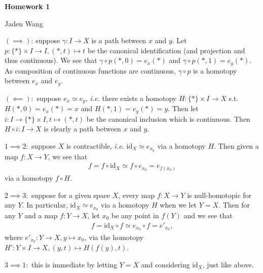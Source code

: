 \documentclass[12pt]{article}
\begin{document}
\centerline {\textsf{\textbf{\LARGE{Homework 1}}}}
\centerline {Jaden Wang}
\vspace{.15in}
\begin{problem}[1]
$ (\implies)$: suppose $ \gamma: I \to X$ is a path between $ x$ and  $ y$. Let $ p: \{*\} \times I \to I, (*,t) \mapsto t$ be the canonical identification (and projection and thus continuous). We see that $ \gamma \circ p(*,0) = e_x(*)$ and $ \gamma \circ p(*,1) = e_y(*)$. As composition of continuous functions are continuous, $ \gamma \circ p$ is a homotopy between $ e_x$ and  $ e_y$.

 $ (\impliedby):$ suppose $ e_x \simeq e_y$, \emph{i.e.} there exists a homotopy $ H: \{*\} \times I \to X$ s.t.\ $ H(*,0) = e_x(*) = x$ and  $ H(*,1) = e_y(*) = y$. Then let $i: I \to \{*\} \times I , t \mapsto (*,t)$ be the canonical inclusion which is continuous. Then $ H \circ i: I \to X$ is clearly a path between $ x$ and  $ y$.
\end{problem}
\begin{problem}[2]
$ 1 \implies 2:$ suppose $ X$ is contractible,  \emph{i.e.} $ \text{id}_{ X} \simeq e_{x_0}$ via a homotopy $ H$. Then given a map $ f: X \to Y$, we see that
\begin{align*}
	f= f \circ \text{id}_{ X} \simeq f \circ e_{x_0} = e_{f(x_0)}
\end{align*}
via a homotopy $ f \circ H$.

$ 2 \implies 3:$ suppose for a given space $ X$, every map $ f:X \to Y$ is null-homotopic for any $ Y$. In particular, $ \text{id}_{ X} \simeq e_{x_0}$ via a homotopy $ H$ when we let $ Y=X$. Then for any $ Y$ and a map $ f: Y \to X$, let $ x_0$ be any point in $ f(Y)$ and we see that
\begin{align*}
	f= \text{id}_{ X} \circ f \simeq e_{x_0} \circ f = e'_{x_0},
\end{align*}
where $ e'_{x_0}: Y \to X, y \mapsto x_0$, via the homotopy $ H': Y \times I \to X, (y,t) \mapsto H(f(y),t)$.

$ 3 \implies 1:$ this is immediate by letting $ Y = X$ and considering  $ \text{id}_{ X}$, just like above.
\end{problem}
\end{document}
